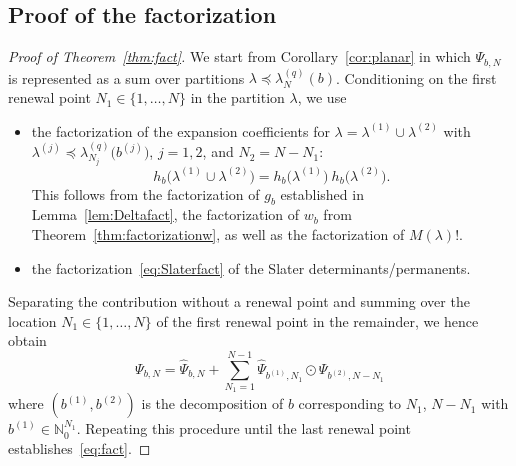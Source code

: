 \documentclass[letterpaper, DIV=17]{scrartcl}
\numberwithin{equation}{section}
\theoremstyle{definition}
\begin{document}
\subsection{Proof of the factorization}\label{sec:factor}
%
\begin{proof}[Proof of Theorem~\ref{thm:fact}]
We start from Corollary~\ref{cor:planar} in which  $  \Psi_{b,N} $ is represented as a sum over partitions $\lambda \preceq \lambda^{(q)}_{N}(b) $. Conditioning on the first renewal point $ N_1 \in \{1, \dots , N\} $ in the partition $ \lambda $, we use 
\begin{itemize}
\item the factorization of the expansion coefficients for $ \lambda = \lambda^{(1)} \cup \lambda^{(2)}  $ with $ \lambda^{(j)} \preceq   \lambda_{N_j}^{(q)}\big(b^{(j)}\big) $, $ j = 1,2 $, and $ N_2 = N - N_1 $:
$$
h_b\big( \lambda^{(1)} \cup \lambda^{(2)} \big) = h_b\big( \lambda^{(1)}\big) \ h_b\big( \lambda^{(2)} \big) .
$$
This follows from the factorization of $ g_b $ established in Lemma~\ref{lem:Deltafact}, the factorization of $ w_b $ from Theorem~\ref{thm:factorizationw}, as well as the factorization of $ M(\lambda)! $. 
\item the factorization~\eqref{eq:Slaterfact} of the Slater determinants/permanents. 
\end{itemize}
Separating the contribution without a renewal point and summing over the location $ N_1 \in \{1, \dots , N\} $ of the first renewal point in the remainder, we hence obtain
\begin{equation}\label{eq:renewal}
	 \Psi_{b,N}  =  \widehat \Psi_{b,N} + \sum_{N_1=1}^{N-1}  \widehat \Psi_{b^{(1)},N_1} \odot  \Psi_{b^{(2)} ,N-N_1} 
\end{equation}
where $  (b^{(1)}, b^{(2)} ) $ is the decomposition of $ b $ corresponding to $ N_1$, $ N-N_1 $ with $ b^{(1)} \in \mathbb{N}_0^{N_1} $. Repeating this procedure until the last renewal point establishes~\eqref{eq:fact}. 


\end{proof}
\end{document}
